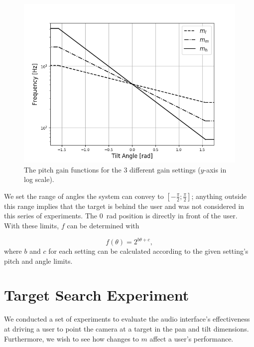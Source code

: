 \documentclass{llncs}
\begin{document}
\begin{figure}
  \centering
  \includegraphics[clip, trim=0 0 0 40, width=1.0\columnwidth]{figures/pitch_gain_functions.png}
  \caption{The pitch gain functions for the 3 different gain settings ($y$-axis in log scale). }\label{fig:pitch-gain}
\end{figure}

We set the range of angles the system can convey to $[-\frac{\pi}{2}; \frac{\pi}{2}]$; anything outside this range implies that the target is behind the user and was not considered in this series of experiments. 
The \SI{0}{\radian} position is directly in front of the user.
With these limits, $f$ can be determined with 

\begin{equation}\label{eq:frequency}
  f(\theta) = 2^{b\theta + c},
\end{equation}
where $b$ and $c$ for each setting can be calculated according to the given setting's pitch and angle limits.%

\section{Target Search Experiment}\label{sec:experiments}

We conducted a set of experiments to evaluate the audio interface's effectiveness at driving a user to point the camera at a target in the pan and tilt dimensions.
Furthermore, we wish to see how changes to $m$ affect a user's performance.
\end{document}

